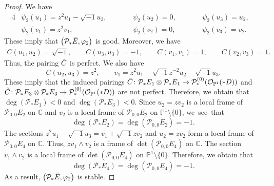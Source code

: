 \documentclass[pdftex]{sigma}
\numberwithin{equation}{section}
\newcommand{\C}{\mathbb{C}}
\newcommand{\ps}{\mathbb{P}}
\begin{document}
\begin{proof}
 We have
 \begin{alignat*}{4}
 &\psi_2(u_1)=z^2 u_1-\sqrt{-1}u_3,\qquad&& \psi_2(u_2)=0,\qquad&& \psi_2(u_3)=u_2,&\\
 &\psi_2(v_1)=z^2v_1,\qquad&& \psi_2(v_2)=0,\qquad&& \psi_2(v_3)=v_2.&
 \end{alignat*}
 These imply that $\bigl(\mathcal{P}_{*}\Tilde{E},\varphi_2\bigr)$ is good. Moreover, we have
 \begin{gather*}
 C(u_1,u_2)=\sqrt{-1},\qquad C(u_3,u_3)=-1,\qquad C(v_1,v_1)=1,\qquad C(v_2,v_3)=1.
 \end{gather*}
 Thus, the pairing $\Tilde{C}$ is perfect. We also have
 \begin{equation*}
 C(u_2,u_3)=z^2,\qquad v_1= z^2u_1-\sqrt{-1}z^{-2}u_2-\sqrt{-1}u_3.
 \end{equation*}
 These imply that the induced pairings $\Tilde{C}\colon \mathcal{P}_{*}E_1\otimes \mathcal{P}_{*}E_1\to \mathcal{P}^{(0)}_*(\mathcal{O}_{\ps^1}(*D))$ and $\Tilde{C}\colon \mathcal{P}_{*}E_3\otimes \mathcal{P}_{*}E_3 \to \mathcal{P}^{(0)}_*(\mathcal{O}_{\ps^1}(*D))$ are not perfect.
 Therefore, we obtain that $\deg(\mathcal{P}_{*}E_1)<0$ and $\deg(\mathcal{P}_{*}E_3)<0$. Since $u_2=zv_2$ is a local frame of $\mathcal{P}_{0,0}E_2$ on $\C$ and $v_2$ is a local frame of $\mathcal{P}_{0,0}E_2$ on $\ps^1\setminus \{0\}$, we~see~that
 \begin{equation*}
 \deg(\mathcal{P}_{*}E_2) = \deg(\mathcal{P}_{0,0}E_2) = -1.
 \end{equation*}
 The sections $z^2u_1-\sqrt{-1}u_3=v_1+\sqrt{-1}zv_2$ and $u_2=zv_2$ form a local frame of $\mathcal{P}_{0,0}E_4$ on $\C$. Thus, $zv_1\wedge v_2$ is a frame of $\det(\mathcal{P}_{0,0}E_4)$ on $\C$. The section $v_1\wedge v_2$ is a local frame of $\det(\mathcal{P}_{0,0}E_4)$ on $\ps^1\setminus \{0\}$. Therefore, we obtain that
 \begin{equation*}
 \deg(\mathcal{P}_{*}E_4) = \deg(\mathcal{P}_{0,0}E_4) = -1.
 \end{equation*}
 As a result, $\bigl(\mathcal{P}_{*}\Tilde{E},\varphi_2\bigr)$ is stable.
\end{proof}
\end{document}
